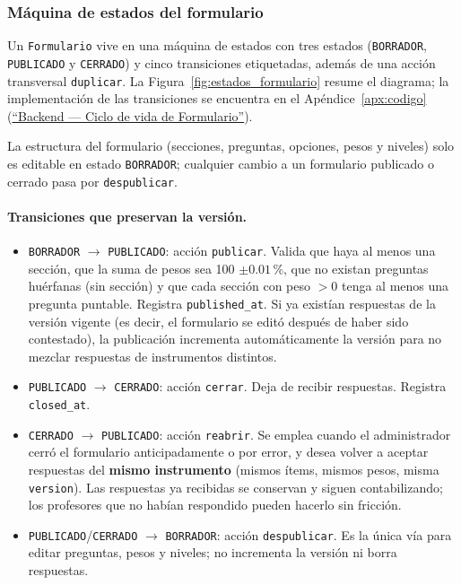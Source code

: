 \subsubsection{Máquina de estados del formulario}\label{subsubsec:estados-formulario}

Un \texttt{Formulario} vive en una máquina de estados con tres estados (\texttt{BORRADOR}, \texttt{PUBLICADO} y \texttt{CERRADO}) y cinco transiciones etiquetadas, además de una acción transversal \texttt{duplicar}. La Figura~\ref{fig:estados_formulario} resume el diagrama; la implementación de las transiciones se encuentra en el Apéndice~\ref{apx:codigo} (\hyperref[lst:formulario_states]{``Backend --- Ciclo de vida de Formulario''}).

La estructura del formulario (secciones, preguntas, opciones, pesos y niveles) solo es editable en estado \texttt{BORRADOR}; cualquier cambio a un formulario publicado o cerrado pasa por \texttt{despublicar}.

\paragraph{Transiciones que preservan la versión.}
\begin{itemize}
    \item \texttt{BORRADOR} $\rightarrow$ \texttt{PUBLICADO}: acción \texttt{publicar}. Valida que haya al menos una sección, que la suma de pesos sea 100 $\pm 0.01$\,\%, que no existan preguntas huérfanas (sin sección) y que cada sección con peso $>0$ tenga al menos una pregunta puntable. Registra \texttt{published\_at}. Si ya existían respuestas de la versión vigente (es decir, el formulario se editó después de haber sido contestado), la publicación incrementa automáticamente la versión para no mezclar respuestas de instrumentos distintos.
    \item \texttt{PUBLICADO} $\rightarrow$ \texttt{CERRADO}: acción \texttt{cerrar}. Deja de recibir respuestas. Registra \texttt{closed\_at}.
    \item \texttt{CERRADO} $\rightarrow$ \texttt{PUBLICADO}: acción \texttt{reabrir}. Se emplea cuando el administrador cerró el formulario anticipadamente o por error, y desea volver a aceptar respuestas del \textbf{mismo instrumento} (mismos ítems, mismos pesos, misma \texttt{version}). Las respuestas ya recibidas se conservan y siguen contabilizando; los profesores que no habían respondido pueden hacerlo sin fricción.
    \item \texttt{PUBLICADO}/\texttt{CERRADO} $\rightarrow$ \texttt{BORRADOR}: acción \texttt{despublicar}. Es la única vía para editar preguntas, pesos y niveles; no incrementa la versión ni borra respuestas.
\end{itemize}

